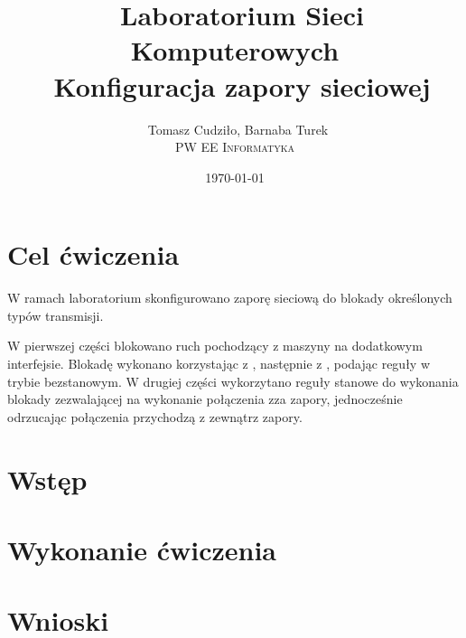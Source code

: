 \documentclass[a4paper,10pt,notitlepage]{article}
\begin{document}
\title{\
Laboratorium Sieci Komputerowych\\\
Konfiguracja zapory sieciowej
}
\author{\
Tomasz Cudziło, Barnaba Turek\\
\textsc{PW EE Informatyka}\\[6pt]
}
\date{\today}

\maketitle
\tableofcontents


\section{Cel ćwiczenia}

W ramach laboratorium skonfigurowano zaporę sieciową do blokady określonych
typów transmisji.

W pierwszej części blokowano ruch \ssh{} pochodzący z maszyny \volt{} na
dodatkowym interfejsie. Blokadę wykonano korzystając z \pf, następnie z \ipfw,
podając reguły w trybie bezstanowym. W drugiej części wykorzytano reguły stanowe
do wykonania blokady zezwalającej na wykonanie połączenia \ssh{} zza zapory,
jednocześnie odrzucając połączenia przychodzą z zewnątrz zapory.


\section{Wstęp}
\label{sec:wstep}



\section{Wykonanie ćwiczenia}




\section{Wnioski}




\end{document}
